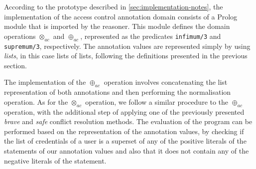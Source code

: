 According to the prototype described in \cref{sec:implementation-notes}, the implementation of the access control
annotation domain consists of a Prolog module that is imported by the reasoner.
%
This module defines the domain operations $\otimes_{ac}$ and $\oplus_{ac}$, represented as the predicates
\texttt{infimum/3} and \texttt{supremum/3}, respectively.
%
The annotation values are represented simply by using \emph{lists}, in this case lists of lists, following the
definitions presented in the previous section. 
%



The implementation of the $\oplus_{ac}$ operation involves concatenating the list representation of both annotations and
then performing the normalisation operation.
%
As for the $\otimes_{ac}$ operation, we follow a similar procedure to the $\oplus_{ac}$ operation, with the additional
step of applying one of the previously presented \emph{brave} and \emph{safe} conflict resolution methods.
%
The evaluation of the \nrdn program can be performed based on the representation of the annotation values, by checking
if the list of credentials of a user is a superset of any of the positive literals of the statements of our annotation
values and also that it does not contain any of the negative literals of the statement.
%

